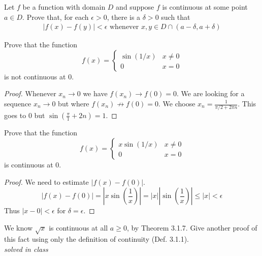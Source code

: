 \documentclass[12pt]{book}
\newenvironment{exercise}[2][Exercise]{\begin{trivlist}
\item[\hskip \labelsep {\bfseries #1}\hskip \labelsep {\bfseries #2.}]}{\end{trivlist}}
\begin{document}
\begin{exercise}{3.1.10}
Let $f$ be a function with domain $D$ and suppose $f$ is continuous at some point $a \in D$. Prove that, for each $\epsilon >0$, there is a $\delta >0$ such that
	\begin{align*}
	|f(x) - f(y) | < \epsilon \text{ whenever } x,y \in D \cap (a-\delta,a+ \delta)
	\end{align*}
\end{exercise}

\begin{exercise}{3.1.11}
    Prove that the function
        \[ f(x)= \begin{cases} \sin (1/x) & x\neq 0 \\ 0 & x =0 \end{cases} \]
    is not continuous at 0.

    \begin{proof}
    Whenever $x_n \to 0$ we have $f(x_n) \to f(0) = 0$. We are looking for a sequence $x_n \to 0$ but where $f(x_n) \not\to f(0)=0$. We choose $x_n = \frac{1}{\pi/2 + 2 \pi n}$. This goes to 0 but $\sin(\frac{\pi}{1} +2n)=1$.
    \end{proof}
\end{exercise}



\begin{exercise}{3.1.12}
    Prove that the function
        \[ f(x)= \begin{cases} x \sin(1/x) & x \neq 0 \\ 0 & x=0 \end{cases} \]
    is continuous at 0.

    \begin{proof}
    We need to estimate $|f(x)-f(0)|$.
    \[ |f(x)-f(0)| = |x \sin \left(\frac{1}{x} \right)| = |x| |\sin \left( \frac{1}{x} \right)| \leq |x| < \epsilon \]
    Thus $|x-0|<\epsilon$ for $\delta = \epsilon$.
    \end{proof}
\end{exercise}







\begin{exercise}{3.1.8}
We know $\sqrt{x}$ is continuous at all $a \geq 0$, by Theorem 3.1.7. Give another proof of this fact using only the definition of continuity (Def. 3.1.1). \\

\emph{solved in class}
\end{exercise}
\end{document}

